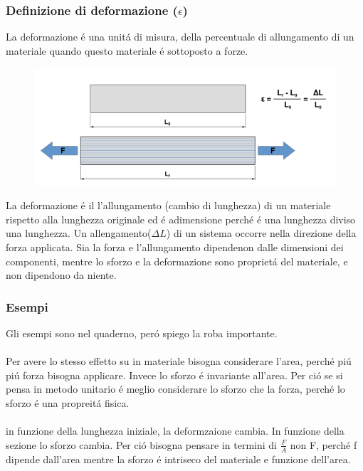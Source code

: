 \documentclass{article}
\begin{document}
            \subsubsection{Definizione di deformazione ($\epsilon$)}
                La deformazione \'e una unit\'a di misura, della percentuale di allungamento di un materiale quando questo materiale \'e sottoposto a forze.\\
                \begin{figure}
                    \centering
                    \includegraphics{Diagramma definizione della deformazione.png}
                \end{figure}
                La deformazione \'e il l'allungamento (cambio di lunghezza) di un materiale rispetto alla lunghezza originale ed \'e adimensione perch\'e \'e una lunghezza diviso una lunghezza.
                Un allengamento($\Delta L$) di un sistema occorre nella direzione della forza applicata. Sia la forza e l'allungamento dipendenon dalle dimensioni dei componenti, mentre lo sforzo e la deformazione sono propriet\'a del materiale, e non dipendono da niente.
            \subsubsection{Esempi}
                Gli esempi sono nel quaderno, per\'o spiego la roba importante.\\ \\
                Per avere lo stesso effetto su in materiale bisogna considerare l'area, perch\'e pi\'u pi\'u forza bisogna applicare. Invece lo sforzo \'e invariante all'area. Per ci\'o se si pensa in metodo unitario \'e meglio considerare lo sforzo che la forza, perch\'e lo sforzo \'e una propreit\'a fisica.\\ \\
                in funzione della lunghezza iniziale, la deformzaione cambia. In funzione della sezione lo sforzo cambia. Per ci\'o bisogna pensare in termini di $\frac{F}{A}$ non F, perch\'e f dipende dall'area mentre la sforzo \'e intriseco del materiale e funzione dell'area.
\end{document}
